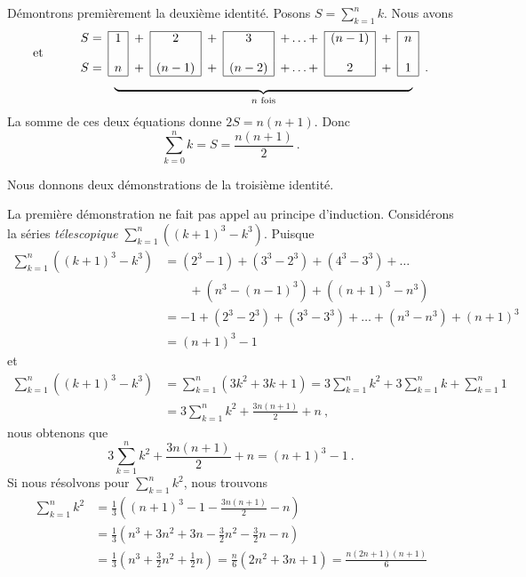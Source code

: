 {\begin{rmk}[\theory]
 Démontrons premièrement la deuxième identité.  Posons
$\displaystyle S = \sum_{k=1}^n k$.  Nous avons
\[
\begin{array}{ll|c|c|c|c|c|c|c|c|c|r}
\cline{3-3}\cline{5-5}\cline{7-7}\cline{9-9}\cline{11-11}
& S = &1&+ &2&+ &3&+ \ldots + &(n-1)&+ &n& \\
\text{et\qquad} &&&&&&&&&&& \\
& S = &n&+ &(n-1)& + &(n-2)&+ \ldots + &2&+ &1& . \\
\cline{3-3}\cline{5-5}\cline{7-7}\cline{9-9}\cline{11-11}
\multicolumn{2}{c}{} &
\multicolumn{9}{c}{\underbrace{\rule{24em}{0em}}_{n\text{ fois}}} &
\end{array}
\]
La somme de ces deux équations donne $2S = n(n+1)$.  Donc
\[
\sum_{k=0}^n k = S = \frac{n(n+1)}{2} \ .
\]

 Nous donnons deux démonstrations de la troisième identité.

 La première démonstration ne fait pas appel au principe
d'induction.  Considérons la séries {\em télescopique}\quad
$\displaystyle \sum_{k=1}^n ((k+1)^3 -k^3)$.  Puisque
\begin{align*}
\sum_{k=1}^n ((k+1)^3 -k^3) &= (2^3 -1)+(3^3-2^3)+(4^3-3^3) + \ldots \\
&\qquad + (n^3-(n-1)^3) + ((n+1)^3-n^3) \\
&= -1 + (2^3 -2^3)+(3^3-3^3) + \ldots + (n^3-n^3) + (n+1)^3 \\
&= (n+1)^3 - 1
\end{align*}
et
\begin{align*}
\sum_{k=1}^n ((k+1)^3 -k^3) &= \sum_{k=1}^n ( 3k^2 + 3k + 1)
= 3 \sum_{k=1}^n k^2 + 3 \sum_{k=1}^n k + \sum_{k=1}^n 1 \\
&= 3 \sum_{k=1}^n k^2 + \frac{3n(n+1)}{2} + n \ ,
\end{align*}
nous obtenons que
\[
3 \sum_{k=1}^n k^2 + \frac{3n(n+1)}{2} + n = (n+1)^3 - 1 \ .
\]
Si nous résolvons pour $\displaystyle \sum_{k=1}^n k^2$, nous trouvons
\begin{align*}
\sum_{k=1}^n k^2 &= \frac{1}{3}
\left( (n+1)^3 - 1 - \frac{3n(n+1)}{2}- n \right) \\
&= \frac{1}{3} \left( n^3 +3n^2 + 3n -\frac{3}{2} n^2 - \frac{3}{2}n -
  n\right)\\
&=\frac{1}{3}\left( n^3 +\frac{3}{2}n^2 + \frac{1}{2}n\right)
= \frac{n}{6}(2n^2 + 3n+1) = \frac{n(2n+1)(n+1)}{6}
\end{align*}


\end{rmk}}
